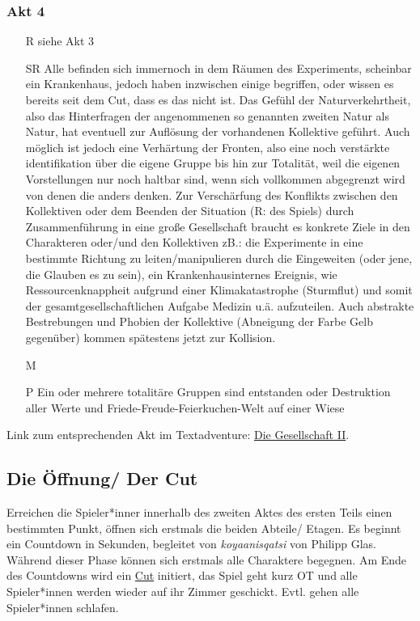 \documentclass[a4paper, 12pt]{scrartcl}
\begin{document}
    \subsubsection{Akt 4}
    \begin{itemize} 
    \item[R]siehe Akt 3
    \item[SR] Alle befinden sich immernoch in dem Räumen des Experiments, scheinbar ein Krankenhaus, jedoch haben inzwischen einige begriffen, oder wissen es bereits seit dem Cut, dass es das nicht ist. Das Gefühl der Naturverkehrtheit, also das Hinterfragen der angenommenen so genannten zweiten Natur als Natur, hat eventuell zur Auflösung der vorhandenen Kollektive geführt. Auch möglich ist jedoch eine Verhärtung der Fronten, also eine noch verstärkte identifikation über die eigene Gruppe bis hin zur Totalität, weil die eigenen Vorstellungen nur noch haltbar sind, wenn sich vollkommen abgegrenzt wird von denen die anders denken. Zur Verschärfung des Konflikts zwischen den Kollektiven oder dem Beenden der Situation (R: des Spiels) durch Zusammenführung in eine große Gesellschaft braucht es konkrete Ziele in den Charakteren oder/und den Kollektiven zB.: die Experimente in eine bestimmte Richtung zu leiten/manipulieren durch die Eingeweiten (oder jene, die Glauben es zu sein), ein Krankenhausinternes Ereignis, wie Ressourcenknappheit aufgrund einer Klimakatastrophe (Sturmflut) und somit der \glqq gesamtgesellschaftlichen \grqq{} Aufgabe Medizin u.ä. aufzuteilen. Auch abstrakte Bestrebungen und Phobien der Kollektive (Abneigung der Farbe Gelb gegenüber) kommen spätestens jetzt zur Kollision. 
    \item[M] 
    \item[P]Ein oder mehrere totalitäre Gruppen sind entstanden oder Destruktion aller Werte und Friede-Freude-Feierkuchen-Welt auf einer Wiese
    \end{itemize}
    
    Link zum entsprechenden Akt im Textadventure: \hyperref[die-gesellschaft2]{Die Gesellschaft II}.
    
    
    \subsection{Die Öffnung/ Der Cut}
    Erreichen die Spieler*inner innerhalb des zweiten Aktes des ersten Teils einen bestimmten Punkt, öffnen sich erstmals die beiden Abteile/ Etagen. 
    Es beginnt ein Countdown in Sekunden, begleitet von \textit{koyaanisqatsi} von Philipp Glas. 
    Während dieser Phase können sich erstmals alle Charaktere begegnen. 
    Am Ende des Countdowns wird ein \hyperref[cut]{Cut} initiert, das Spiel geht kurz OT und alle Spieler*innen werden wieder auf ihr Zimmer geschickt. 
    Evtl. gehen alle Spieler*innen schlafen.  
\end{document}
